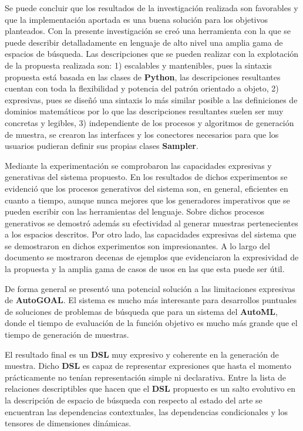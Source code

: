 \begin{conclusions}
      Se puede concluir que los resultados de la investigación realizada son favorables
      y que la implementación aportada es una buena solución para los objetivos planteados.
      Con la presente investigación se creó una herramienta con la que se puede describir
      detalladamente en lenguaje de alto nivel una amplia gama de espacios de búsqueda.
      Las descripciones que se pueden realizar con la explotación de la propuesta realizada
      son: 1) escalables y mantenibles, pues la sintaxis propuesta está basada en las
      clases de {\bf Python}, las descripciones resultantes cuentan con toda la flexibilidad y potencia
      del patrón orientado a objeto, 2) expresivas, pues se diseñó una sintaxis lo más
      similar posible a las definiciones de dominios matemáticos por lo que las descripciones resultantes suelen
      ser muy concretas y legibles, 3) independiente de los procesos y algoritmos de generación de
      muestra, se crearon las interfaces y los conectores necesarios para que los usuarios
      pudieran definir sus propias clases {\bf Sampler}.

      Mediante la experimentación se comprobaron las capacidades expresivas y generativas del 
      sistema propuesto. En los resultados de dichos 
      experimentos se evidenció que los procesos generativos del sistema son, en 
      general, eficientes en cuanto a tiempo, aunque nunca mejores que los generadores 
      imperativos que se pueden escribir con las herramientas del lenguaje. 
      Sobre dichos procesos generativos se demostró además su efectividad al generar muestras pertenecientes a los 
      espacios descritos. Por otro lado, las capacidades expresivas del sistema que se demostraron en dichos 
      experimentos son impresionantes. A lo largo del documento se mostraron decenas de ejemplos 
      que evidenciaron la expresividad de 
      la propuesta y la amplia gama de casos de usos en las que esta puede ser útil.

      De forma general se presentó una potencial solución a las limitaciones expresivas de {\bf AutoGOAL}.
      El sistema es mucho más interesante para desarrollos puntuales de
      soluciones de problemas de búsqueda que para un sistema del {\bf AutoML}, donde el tiempo de evaluación
      de la función objetivo es mucho más grande que el tiempo de generación de muestras.

      El resultado final es un {\bf DSL} muy expresivo y coherente en la generación de muestra. Dicho {\bf DSL} es
      capaz de representar expresiones que hasta el momento prácticamente no tenían representación simple
      ni declarativa. Entre la lista de relaciones descriptibles que hacen que el {\bf DSL} propuesto es un
      salto evolutivo en la descripción de espacio de búsqueda con respecto al estado del arte se
      encuentran las dependencias contextuales, las dependencias condicionales y los tensores de
      dimensiones dinámicas.


\end{conclusions}
